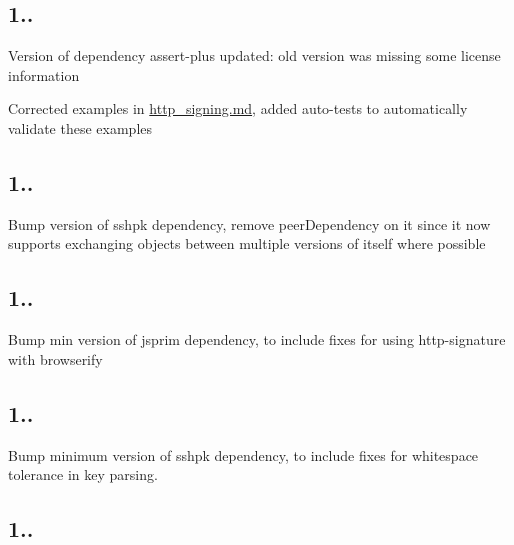 \subsection*{1..}


\begin{DoxyItemize}
\item Version of dependency {\ttfamily assert-\/plus} updated\+: old version was missing some license information
\item Corrected examples in {\ttfamily \mbox{\hyperlink{http__signing_8md}{http\+\_\+signing.\+md}}}, added auto-\/tests to automatically validate these examples
\end{DoxyItemize}

\subsection*{1..}


\begin{DoxyItemize}
\item Bump version of {\ttfamily sshpk} dependency, remove peer\+Dependency on it since it now supports exchanging objects between multiple versions of itself where possible
\end{DoxyItemize}

\subsection*{1..}


\begin{DoxyItemize}
\item Bump min version of {\ttfamily jsprim} dependency, to include fixes for using http-\/signature with {\ttfamily browserify}
\end{DoxyItemize}

\subsection*{1..}


\begin{DoxyItemize}
\item Bump minimum version of {\ttfamily sshpk} dependency, to include fixes for whitespace tolerance in key parsing.
\end{DoxyItemize}

\subsection*{1..}


